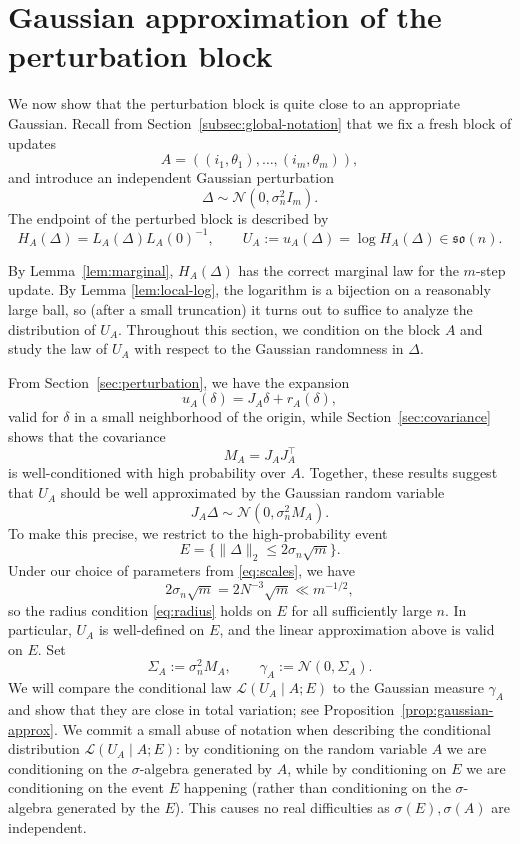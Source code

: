\documentclass[11pt, reqno]{amsart}
\numberwithin{equation}{section}
\theoremstyle{remark}
\newcommand{\1}{\mathbf{1}}
\newcommand{\so}{\mathfrak{so}}
\newcommand{\Law}{\mathcal{L}}
\begin{document}
\section{Gaussian approximation of the perturbation block}\label{sec:transport}

We now show that the perturbation block is quite close to an appropriate Gaussian. Recall from Section~\ref{subsec:global-notation} that we fix a fresh block of updates
\[
A=((i_1,\theta_1),\dots,(i_m,\theta_m)),
\]
and introduce an independent Gaussian perturbation
\[
\Delta \sim \mathcal N(0,\sigma_n^2 I_m).
\]
The endpoint of the perturbed block is described by
\[
H_A(\Delta)=L_A(\Delta)L_A(0)^{-1},
\qquad
U_A := u_A(\Delta)=\log H_A(\Delta)\in \so(n).
\]

By Lemma~\ref{lem:marginal}, $H_A(\Delta)$ has the correct marginal law for the $m$-step update. By Lemma \ref{lem:local-log}, the logarithm is a bijection on a reasonably large ball, so (after a small truncation) it turns out to suffice to analyze the distribution of $U_A$. Throughout this section, we condition on the block $A$ and study the law of $U_A$ with respect to the Gaussian randomness in $\Delta$.

From Section~\ref{sec:perturbation}, we have the expansion
\[
u_A(\delta)=J_A\delta + r_A(\delta),
\]
valid for $\delta$ in a small neighborhood of the origin, while Section~\ref{sec:covariance} shows that the covariance
\[
M_A = J_A J_A^\top
\]
is well-conditioned with high probability over $A$. Together, these results suggest that $U_A$ should be well approximated by the Gaussian random variable
\[
J_A \Delta \sim \mathcal N(0,\sigma_n^2 M_A).
\]
To make this precise, we restrict to the high-probability event
\begin{equation} \label{eq:E-def}
E = \Big \{\|\Delta\|_2 \le 2\sigma_n \sqrt{m} \Big \}.
\end{equation}
Under our choice of parameters from \eqref{eq:scales}, we have
\[
2\sigma_n\sqrt{m} = 2N^{-3}\sqrt{m} \ll m^{-1/2},
\]
so the radius condition \eqref{eq:radius} holds on $E$ for all sufficiently large $n$. In particular, $U_A$ is well-defined on $E$, and the linear approximation above is valid on $E$.
Set
\begin{equation}
\label{eq:Sigma-gamma-def}
\Sigma_A := \sigma_n^2 M_A,
\qquad
\gamma_A := \mathcal N(0,\Sigma_A).
\end{equation}
We will compare the conditional law $\Law(U_A \mid A; E)$ to the Gaussian measure
$\gamma_A$ and show that they are close in total variation; see Proposition~\ref{prop:gaussian-approx}. We commit a small abuse of notation when describing the conditional distribution  $\Law(U_A \mid A; E)$: by conditioning on the random variable $A$ we are conditioning on the $\sigma$-algebra generated by $A$, while by conditioning on $E$ we are conditioning on the event $E$ happening (rather than conditioning on the $\sigma$-algebra generated by the $E$). This causes no real difficulties as $\sigma(E), \sigma(A)$ are independent.
\end{document}
